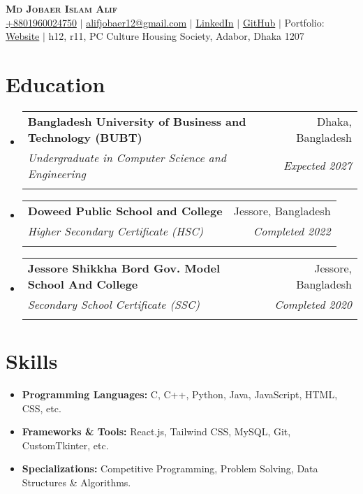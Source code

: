 \documentclass[letterpaper,11pt]{article}
\makeatletter
\newcommand{\resumeItem}[1]{
  \item\small{
    {#1 \vspace{-2pt}}
  }
}
\newcommand{\resumeEducationHeading}[6]{
  \vspace{-2pt}\item
    \begin{tabular*}{0.97\textwidth}[t]{l@{\extracolsep{\fill}}r}
      \textbf{#1} & #2 \\
      \textit{\small#3} & \textit{\small #4} \\
      \textit{\small#5} & \textit{\small #6} \\
    \end{tabular*}\vspace{-5pt}
}
\newcommand{\resumeSubHeadingListStart}{\begin{itemize}[leftmargin=0.15in, label={}]}
\newcommand{\resumeSubHeadingListEnd}{\end{itemize}}
\newcommand{\resumeItemListStart}{\begin{itemize}}
\newcommand{\resumeItemListEnd}{\end{itemize}\vspace{-5pt}}
\makeatother
\begin{document}
\begin{center}
    \textbf{\Huge \scshape Md Jobaer Islam Alif} \\ \vspace{3pt}
    \small
    \faMobile \hspace{.5pt} \href{tel:+8801960024750}{+8801960024750}
    $|$
    \faAt \hspace{.5pt} \href{mailto:alifjobaer12@gmail.com}{alifjobaer12@gmail.com}
    $|$
    \faLinkedinSquare \hspace{.5pt} \href{https://www.linkedin.com/in/alifjobaer12}{LinkedIn}
    $|$
    \faGithub \hspace{.5pt} \href{https://github.com/alifjobaer12}{GitHub}
    $|$
    \faGlobe \hspace{.5pt} Portfolio: \href{https://alifjobaer12.github.io}{Website}
    $|$
    \faMapMarker \hspace{.5pt} h12, r11, PC Culture Housing Society, Adabor, Dhaka 1207
\end{center}

\section{Education}
  \resumeSubHeadingListStart
    \resumeEducationHeading
      {Bangladesh University of Business and Technology (BUBT)}{Dhaka, Bangladesh}
      {Undergraduate in Computer Science and Engineering}{Expected 2027}
      {}{}
    \resumeEducationHeading
      {Doweed Public School and College}{Jessore, Bangladesh}
      {Higher Secondary Certificate (HSC)}{Completed 2022}
      {}{}
    \resumeEducationHeading
      {Jessore Shikkha Bord Gov. Model School And College}{Jessore, Bangladesh}
      {Secondary School Certificate (SSC)}{Completed 2020}
      {}{}
  \resumeSubHeadingListEnd

\section{Skills}
  \resumeSubHeadingListStart
    \resumeItemListStart
        \resumeItem{\textbf{Programming Languages:} C, C++, Python, Java, JavaScript, HTML, CSS, etc.}
        \resumeItem{\textbf{Frameworks \& Tools:} React.js, Tailwind CSS, MySQL, Git, CustomTkinter, etc.}
        \resumeItem{\textbf{Specializations:} Competitive Programming, Problem Solving, Data Structures \& Algorithms.}
    \resumeItemListEnd
  \resumeSubHeadingListEnd
\end{document}
